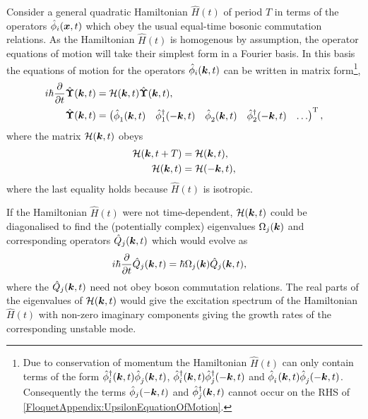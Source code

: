 Consider a general quadratic Hamiltonian $\hat{H}(t)$ of period $T$ in terms of the operators $\hat{\phi}_i(\bm{x}, t)$ which obey the usual equal-time bosonic commutation relations. As the Hamiltonian $\hat{H}(t)$ is homogenous by assumption, the operator equations of motion will take their simplest form in a Fourier basis. In this basis the equations of motion for the operators $\hat{\phi}_i(\bm{k}, t)$ can be written in matrix form\footnote{Due to conservation of momentum the Hamiltonian $\hat{H}(t)$ can only contain terms of the form $\hat{\phi}_i^\dagger(\bm{k}, t) \hat{\phi}_j^{\phantom{\dagger}}(\bm{k}, t)$, $\hat{\phi}_i^\dagger(\bm{k}, t) \hat{\phi}_j^{\dagger}(-\bm{k}, t)$ and $\hat{\phi}_i^{\phantom{\dagger}}(\bm{k}, t) \hat{\phi}_j^{\phantom{\dagger}}(-\bm{k}, t)$. Consequently the terms $\hat{\phi}_j(-\bm{k}, t)$ and $\hat{\phi}_j^\dagger(\bm{k}, t)$ cannot occur on the RHS of \eqref{FloquetAppendix:UpsilonEquationOfMotion}.},
\begin{subequations}
    \label{FloquetAppendix:MatrixOperatorEvolution}
    \begin{align}
        i \hbar \frac{\partial }{\partial t}\hat{\vect{\Upsilon}}(\vect{k}, t) &= \mathcal{H}(\vect{k}, t) \hat{\vect{\Upsilon}}(\vect{k}, t), \label{FloquetAppendix:UpsilonEquationOfMotion}\\
        \hat{\vect{\Upsilon}}(\vect{k}, t) &= 
        \begin{pmatrix}
            \hat{\phi}_1^{\phantom{\dagger}}(\vect{k}, t) &
            \hat{\phi}_1^\dagger(-\vect{k}, t) &
            \hat{\phi}_2^{\phantom{\dagger}}(\vect{k}, t) &
            \hat{\phi}_2^\dagger(-\vect{k}, t) &
            \dots
        \end{pmatrix}^\text{T},
    \end{align}
\end{subequations}
where the matrix $\mathcal{H}(\bm{k}, t)$ obeys
\begin{align}
        \mathcal{H}(\vect{k}, t+T) &= \mathcal{H}(\vect{k}, t),\\
        \mathcal{H}(\vect{k}, t) &= \mathcal{H}(-\vect{k}, t), \label{FloquetAppendix:HReflectionSymmetry}
\end{align}
where the last equality holds because $\hat{H}(t)$ is isotropic.

If the Hamiltonian $\hat{H}(t)$ were not time-dependent, $\mathcal{H}(\bm{k}, t)$ could be diagonalised to find the (potentially complex) eigenvalues $\Omega_j(\bm{k})$ and corresponding operators $\hat{Q}_j(\bm{k}, t)$ which would evolve as
\begin{align}
    \label{FloquetAppendix:ContinouousTimeEigenoperators}
    i \hbar \frac{\partial }{\partial t}\hat{Q}_j(\vect{k}, t) &= \hbar \Omega_j(\vect{k}) \hat{Q}_j(\vect{k}, t),
\end{align}
where the $\hat{Q}_j(\bm{k}, t)$ need not obey boson commutation relations. The real parts of the eigenvalues of $\mathcal{H}(\bm{k}, t)$ would give the excitation spectrum of the Hamiltonian $\hat{H}(t)$ with non-zero imaginary components giving the growth rates of the corresponding unstable mode.

